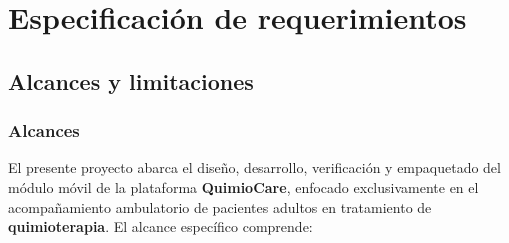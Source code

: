 \chapter{Especificación de requerimientos}

\section{Alcances y limitaciones}

\subsection{Alcances}
El presente proyecto abarca el diseño, desarrollo, verificación y empaquetado del módulo móvil de la plataforma \textbf{QuimioCare}, enfocado exclusivamente en el acompañamiento ambulatorio de pacientes adultos en tratamiento de \textbf{quimioterapia}. El alcance específico comprende:

